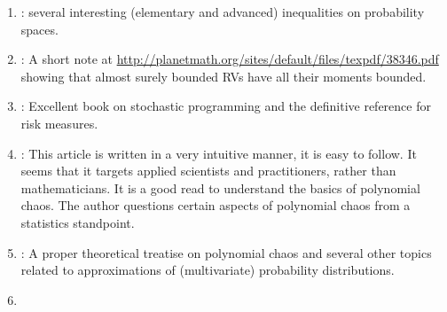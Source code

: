 \documentclass[a4paper,10pt]{article}
\let\oldbibentry\bibentry
\renewcommand{\bibentry}[1]{{\color{blue} \oldbibentry{#1}}}
\begin{document}
{\begin{enumerate}
       and ergodic theorems and some notes on dynamic programming. 
       Available online at \url{https://www.math.nyu.edu/faculty/varadhan/}.
 \item \label{cite:LinBai2011} : several interesting (elementary 
       and advanced) inequalities on probability spaces.  
 \item \label{cite:Ambrosio2013} : A short note at
       \url{http://planetmath.org/sites/default/files/texpdf/38346.pdf}
       showing that almost surely bounded RVs have all their moments bounded.
 \item \label{cite:SDR2014} : Excellent book on stochastic programming and 
       the definitive reference for risk measures.
 \item \label{cite:AOHaganPolyChaos13} : This article is written 
       in a very intuitive manner, it is easy to follow. It seems that it targets applied scientists
       and practitioners, rather than mathematicians. It is a good read to understand the basics of 
       polynomial chaos. The author questions certain aspects of polynomial chaos from 
       a statistics standpoint.
 \item \label{cite:DXiu10} : A proper theoretical treatise on polynomial chaos
       and several other topics related to approximations of (multivariate) probability distributions.
 \item \label{cite:Eldred2009}        
\end{enumerate}
}



\end{document}
